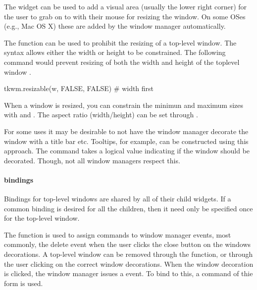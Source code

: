 The  widget can be used to add a visual area (usually the lower right corner) for the user to grab on to with their mouse for resizing the window. On some OSes (e.g., Mac OS X) these are added by the window manager automatically. 

The  function can be used to prohibit the
resizing of a top-level window. The syntax allows either the width or
height to be constrained. The following command would  prevent
resizing of both the width and height of the toplevel window . 

\begin{Schunk}
  \begin{Sinput}
tkwm.resizable(w, FALSE, FALSE)    # width first
  \end{Sinput}
\end{Schunk}

When a window is resized, you can constrain the minimun and maximum sizes with  and . The aspect ratio (width/height) can be set through .


For some uses it may be desirable to not have the window manager
decorate the window with a title bar etc. Tooltips, for example, can
be constructed using this approach. The command  takes a logical value
indicating if the window should be decorated. Though, not all window
managers respect this.



\paragraph{bindings}
Bindings for top-level windows are shared by all of their child widgets. If a common binding is desired for all the children, then it need only be specified once for the top-level window.


The  function is used to assign commands to
window manager events, most commonly, the delete event when the user
clicks the close button on the windows decorations. A top-level window
can be removed through the  function, or through
the user clicking on the correct window decorations. When the window decoration is clicked, the window manager issues a  event. To bind to this, a command of thie form  is used. 

